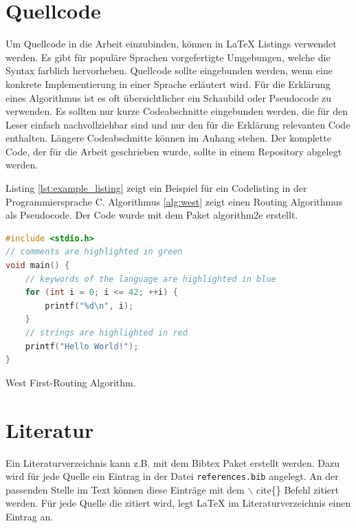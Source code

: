\section{Quellcode}
Um Quellcode in die Arbeit einzubinden, können in \LaTeX{} Listings verwendet werden. Es gibt für populäre Sprachen vorgefertigte Umgebungen, welche die Syntax farblich hervorheben. Quellcode sollte eingebunden werden, wenn eine konkrete Implementierung in einer Sprache erläutert wird. Für die Erklärung eines Algorithmus ist es oft übersichtlicher ein Schaubild oder Pseudocode zu verwenden. Es sollten nur kurze Codeabschnitte eingebunden werden, die für den Leser einfach nachvollziehbar sind und nur den für die Erklärung relevanten Code enthalten. Längere Codeabschnitte können im Anhang stehen. Der komplette Code, der für die Arbeit geschrieben wurde, sollte in einem Repository abgelegt werden.

Listing \ref{lst:example_listing} zeigt ein Beispiel für ein Codelisting in der Programmiersprache C. Algorithmus \ref{alg:west} zeigt einen Routing Algorithmus als Pseudocode. Der Code wurde mit dem Paket algorithm2e \cite{algorithm2e} erstellt.

\begin{lstlisting}[language=C, caption=Beispiel für ein Codelisting in der Sprache C., label=lst:example_listing]
#include <stdio.h>
// comments are highlighted in green
void main() {
    // keywords of the language are highlighted in blue
    for (int i = 0; i <= 42; ++i) {
        printf("%d\n", i);
    }
    // strings are highlighted in red
    printf("Hello World!");
}
\end{lstlisting}

\begin{algorithm}[ht]

 \caption{West First-Routing Algorithm.}
 \label{alg:west}
\end{algorithm}

\section{Literatur}
Ein Literaturverzeichnis kann z.B. mit dem Bibtex Paket \cite{bibtex} erstellt werden. Dazu wird für jede Quelle ein Eintrag in der Datei \texttt{references.bib} angelegt. An der passenden Stelle im Text können diese Einträge mit dem \ensuremath{\backslash} cite\{\} Befehl zitiert werden. Für jede Quelle die zitiert wird, legt \LaTeX{}  im Literaturverzeichnis einen Eintrag an.

